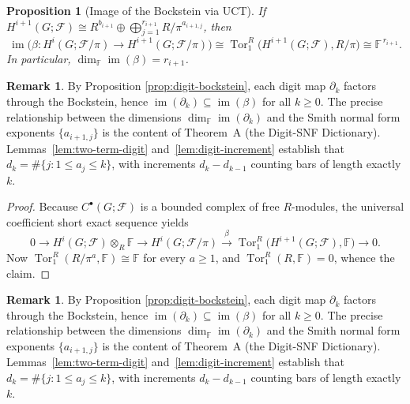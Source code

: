 \documentclass[11pt]{amsart}
\theoremstyle{plain}
\newtheorem{proposition}[theorem]{Proposition}
\theoremstyle{definition}
\newtheorem{remark}[theorem]{Remark}
\newcommand{\Ring}{R}                          %
\newcommand{\unif}{\pi}                        %
\newcommand{\sheaf}[1]{\mathcal{#1}}                  %
\newcommand{\Bock}{\beta}            %
\newcommand{\Digit}[1]{\partial_{#1}}%
\DeclareMathOperator{\im}{im}                         %
\DeclareMathOperator{\Tor}{Tor}                       %
\begin{document}
\begin{proposition}[Image of the Bockstein via UCT]
\label{prop:bockstein-image}
If $H^{i+1}(G;\sheaf{F}) \cong \Ring^{b_{i+1}} \oplus \bigoplus_{j=1}^{r_{i+1}} \Ring/\unif^{a_{i+1,j}}$, then
\[
\im\bigl(\Bock:H^i(G;\sheaf{F}/\unif)\to H^{i+1}(G;\sheaf{F}/\unif)\bigr)
\cong \Tor_1^\Ring\!\bigl(H^{i+1}(G;\sheaf{F}),\Ring/\unif\bigr)
\cong \mathbb{F}^{\,r_{i+1}}.
\]
In particular, $\dim_{\mathbb{F}}\im(\Bock)=r_{i+1}$.
\end{proposition}

\begin{remark}
\label{rem:digit-bockstein-relationship}
By Proposition \ref{prop:digit-bockstein}, each digit map $\Digit{k}$ factors through the 
Bockstein, hence $\im(\Digit{k}) \subseteq \im(\Bock)$ for all $k \ge 0$. The precise 
relationship between the dimensions $\dim_{\mathbb{F}}\im(\Digit{k})$ and the Smith 
normal form exponents $\{a_{i+1,j}\}$ is the content of Theorem~A 
(the Digit-SNF Dictionary). Lemmas~\ref{lem:two-term-digit} and~\ref{lem:digit-increment} 
establish that $d_k = \#\{j : 1 \le a_j \le k\}$, with increments $d_k - d_{k-1}$ counting 
bars of length exactly $k$.
\end{remark}

\begin{proof}
Because $C^\bullet(G;\sheaf{F})$ is a bounded complex of free $\Ring$-modules, \cite{Rotman2009}
the universal coefficient short exact sequence yields
\[
0\to H^i(G;\sheaf{F})\otimes_\Ring\mathbb{F}\to H^i(G;\sheaf{F}/\unif)
\xrightarrow{\;\Bock\;} \Tor_1^\Ring\!\bigl(H^{i+1}(G;\sheaf{F}),\mathbb{F}\bigr)\to 0.
\]
Now $\Tor_1^\Ring(\Ring/\unif^{a},\mathbb{F})\cong\mathbb{F}$ for every $a\ge 1$, and 
$\Tor_1^\Ring(\Ring,\mathbb{F})=0$, whence the claim.
\end{proof}

\begin{remark}
By Proposition \ref{prop:digit-bockstein}, each digit map $\Digit{k}$ factors through the 
Bockstein, hence $\im(\Digit{k}) \subseteq \im(\Bock)$ for all $k \ge 0$. The precise 
relationship between the dimensions $\dim_{\mathbb{F}}\im(\Digit{k})$ and the Smith 
normal form exponents $\{a_{i+1,j}\}$ is the content of Theorem~A 
(the Digit-SNF Dictionary). Lemmas~\ref{lem:two-term-digit} and~\ref{lem:digit-increment} 
establish that $d_k = \#\{j : 1 \le a_j \le k\}$, with increments $d_k - d_{k-1}$ counting 
bars of length exactly $k$.
\end{remark}


\end{document}
